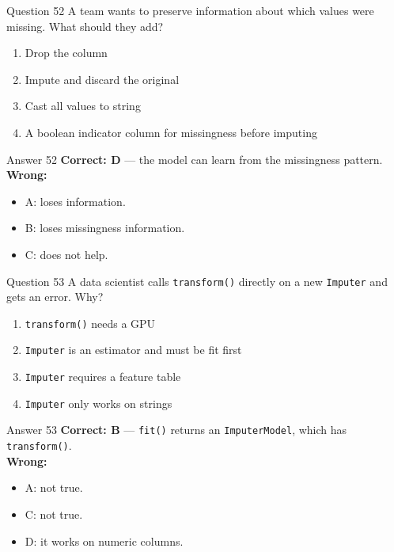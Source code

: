 \documentclass[aspectratio=169,11pt]{beamer}
\begin{document}
	\begin{frame}{Question 52}
		A team wants to preserve information about which values were missing. What should they add?
		\begin{enumerate}[label=\Alph*.]
			\item Drop the column
			\item Impute and discard the original
			\item Cast all values to string
			\item A boolean indicator column for missingness before imputing
		\end{enumerate}
	\end{frame}
	\begin{frame}{Answer 52}
		\textbf{Correct: D} --- the model can learn from the missingness pattern.\\
		\vspace{0.5em}
		\textbf{Wrong:}
		\begin{itemize}
			\item A: loses information.
			\item B: loses missingness information.
			\item C: does not help.
		\end{itemize}
	\end{frame}
	
	\begin{frame}{Question 53}
		A data scientist calls \texttt{transform()} directly on a new \texttt{Imputer} and gets an error. Why?
		\begin{enumerate}[label=\Alph*.]
			\item \texttt{transform()} needs a GPU
			\item \texttt{Imputer} is an estimator and must be fit first
			\item \texttt{Imputer} requires a feature table
			\item \texttt{Imputer} only works on strings
		\end{enumerate}
	\end{frame}
	\begin{frame}{Answer 53}
		\textbf{Correct: B} --- \texttt{fit()} returns an \texttt{ImputerModel}, which has \texttt{transform()}.\\
		\vspace{0.5em}
		\textbf{Wrong:}
		\begin{itemize}
			\item A: not true.
			\item C: not true.
			\item D: it works on numeric columns.
		\end{itemize}
	\end{frame}
	
\end{document}
